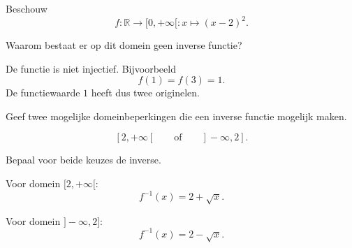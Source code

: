 \documentclass{ximera}
\begin{document}
\begin{oefening}{\oefU\ESS}

Beschouw
\[
f:\mathbb R\to[0,+\infty[:x\mapsto(x-2)^2.
\]

\begin{question}
Waarom bestaat er op dit domein geen inverse functie?

\begin{oplossing}
De functie is niet injectief. Bijvoorbeeld
\[
f(1)=f(3)=1.
\]
De functiewaarde \(1\) heeft dus twee originelen.
\end{oplossing}
\end{question}

\begin{question}
Geef twee mogelijke domeinbeperkingen die een inverse functie mogelijk maken.

\begin{oplossing}
\[
[2,+\infty[
\qquad\text{of}\qquad
]-\infty,2].
\]
\end{oplossing}
\end{question}

\begin{question}
Bepaal voor beide keuzes de inverse.

\begin{oplossing}
Voor domein \([2,+\infty[\):
\[
f^{-1}(x)=2+\sqrt{x}.
\]

Voor domein \(]-\infty,2]\):
\[
f^{-1}(x)=2-\sqrt{x}.
\]
\end{oplossing}
\end{question}

\end{oefening}
\end{document}
